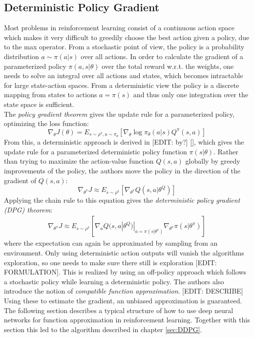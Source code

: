 \subsection{Deterministic Policy Gradient}
\label{sec:DPG}
Most problems in reinforcement learning consist of a continuous action space which makes it very difficult to greedily choose the best action given a policy, due to the max operator. From a stochastic point of view, the policy is a probability distribution $a\sim\pi(a|s)$ over all actions. In order to calculate the gradient of a parameterized policy $\pi(a,s|\theta)$ over the total reward w.r.t. the weights, one needs to solve an integral over all actions and states, which becomes intractable for large state-action spaces.
From a deterministic view the policy is a discrete mapping from states to actions $a=\pi(s)$ and thus only one integration over the state space is sufficient.\\ 
The \textit{policy gradient theorem} \citep{sutton2018reinforcement} gives the update rule for a parameterized policy, optimizing the loss function: 
\[
\nabla_{\theta}J(\theta)=E_{s\sim\rho^\pi,a\sim\pi_\theta}
\left[\nabla_\theta \log \pi_\theta(a|s)Q^\pi(s,a)\right] 
\]
From this, a deterministic approach is derived in [EDIT: by?] [\cite{silver2014deterministic}], which gives the update rule for a parameterized deterministic policy function $\pi(s|\theta)$. Rather than trying to maximize the action-value function $Q(s,a)$ globally by greedy improvements of the policy, the authors move the policy in the direction of the gradient of $Q(s,a)$:
\[
\nabla_{\theta^\pi}J\approx E_{s\sim\rho^\pi}\left[\nabla_{\theta^\pi}Q(s,a|\theta^Q)\right]
\]
Applying the chain rule to this equation gives the \textit{deterministic policy gradient (DPG) theorem}:
\begin{align*}
\nabla_{\theta^\pi}J\approx E_{s\sim\rho^\pi}\left[\nabla_aQ(s,a|\theta^Q)|_{a=\pi(s|\theta^\pi)} \nabla_{\theta^\pi}\pi(s|\theta^\pi)\right]
\end{align*}
where the expectation can again be approximated by sampling from an environment.
Only using deterministic action outputs will vanish the algorithms exploration, so one needs to make sure there still is exploration [EDIT: FORMULATION]. This is realized by using an off-policy approach which follows a stochastic policy while learning a deterministic policy. The authors also introduce the notion of \textit{compatible function approximation}.
[EDIT: DESCRIBE] Using these to estimate the gradient, an unbiased approximation is guaranteed.\\
The following section describes a typical structure of how to use deep neural networks for function approximation in reinforcement learning. Together with this section this led to the algorithm described in chapter \ref{sec:DDPG}.

